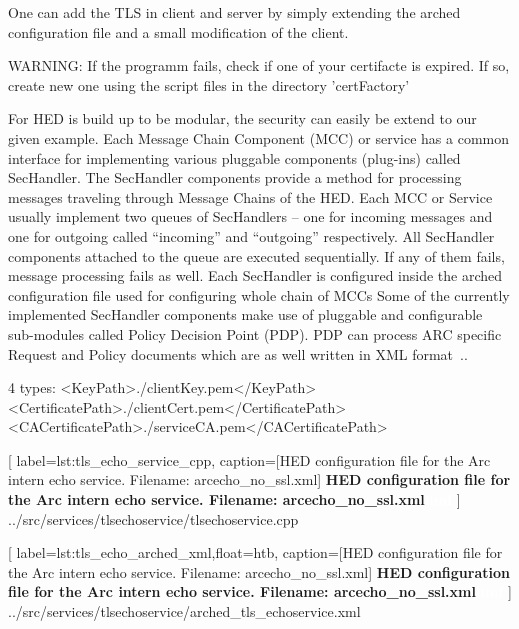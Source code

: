 One can add the TLS in client and server by simply extending the arched configuration file and a small modification of the client.



WARNING: If the programm fails, check if one of your certifacte is expired. If so, create new one using the script files in the directory 'certFactory'

For HED is build up to  %
be modular, the security can easily be extend to our given example.
Each Message Chain Component (MCC) or service has a common interface for implementing various pluggable components (plug-ins) called SecHandler. The SecHandler components provide a method for processing messages traveling through Message Chains of the HED. 
Each MCC or Service usually implement two queues of SecHandlers – one for incoming messages and one for outgoing called “incoming” and “outgoing” respectively. All SecHandler components attached to the queue are executed sequentially. 
If any of them fails, message processing fails as well. 
Each SecHandler is configured inside the arched configuration file used for configuring whole chain of MCCs 
Some of the currently implemented SecHandler components make use of pluggable and configurable sub-modules called Policy Decision Point (PDP). PDP can process ARC specific Request and Policy documents which are as well written in XML format~\cite{QIANG_2008}..




4 types:
                <KeyPath>./clientKey.pem</KeyPath>
                <CertificatePath>./clientCert.pem</CertificatePath>
                <CACertificatePath>./serviceCA.pem</CACertificatePath>


	[
	label=lst:tls_echo_service_cpp,
	caption={[HED configuration file for the Arc intern echo service. Filename: arcecho\_no\_ssl.xml]
	\textbf{HED configuration file for the Arc intern echo service. Filename: arcecho\_no\_ssl.xml\textcolor{white}{hmf}}}
	]
{../src/services/tlsechoservice/tlsechoservice.cpp}





	[
	label=lst:tls_echo_arched_xml,float=htb,
	caption={[HED configuration file for the Arc intern echo service. Filename: arcecho\_no\_ssl.xml]
	\textbf{HED configuration file for the Arc intern echo service. Filename: arcecho\_no\_ssl.xml\textcolor{white}{hmf}}}
	]
{../src/services/tlsechoservice/arched_tls_echoservice.xml}


